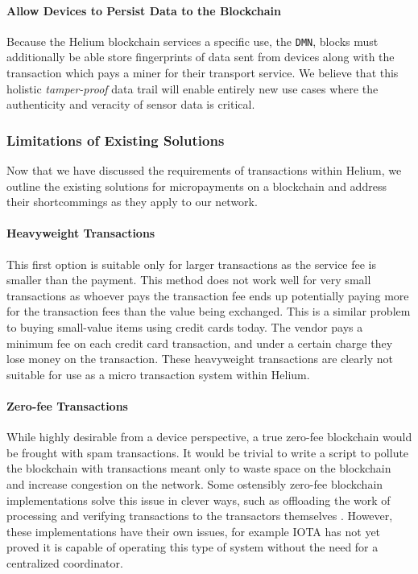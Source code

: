 \documentclass[10pt, nonatbib, nocopyrightspace, reprint]{sigplanconf}
\begin{document}
\paragraph{Allow Devices to Persist Data to the Blockchain}
Because the Helium blockchain services a specific use, the \verb|DMN|, blocks must additionally be able store fingerprints of data sent from devices along with the transaction which pays a miner for their transport service.  We believe that this holistic \emph{tamper-proof} data trail will enable entirely new use cases where the authenticity and veracity of sensor data is critical.

\subsubsection{Limitations of Existing Solutions}

Now that we have discussed the requirements of transactions within Helium, we outline the existing solutions for micropayments on a blockchain and address their shortcommings as they apply to our network.

\paragraph{Heavyweight Transactions}
This first option is suitable only for larger transactions as the service fee is smaller than the payment. This method does not work well for very small transactions as whoever pays the transaction fee ends up potentially paying more for the transaction fees than the value being exchanged. This is a similar problem to buying small-value items using credit cards today. The vendor pays a minimum fee on each credit card transaction, and under a certain charge they lose money on the transaction. These heavyweight transactions are clearly not suitable for use as a micro transaction system within Helium.

\paragraph{Zero-fee Transactions}
While highly desirable from a device perspective, a true zero-fee blockchain would be frought with spam transactions. It would be trivial to write a script to pollute the blockchain with transactions meant only to waste space on the blockchain and increase congestion on the network. Some ostensibly zero-fee blockchain implementations solve this issue in clever ways, such as offloading the work of processing and verifying transactions to the transactors themselves \cite{iota}. However, these implementations have their own issues, for example IOTA has not yet proved it is capable of operating this type of system without the need for a centralized coordinator.
\end{document}
